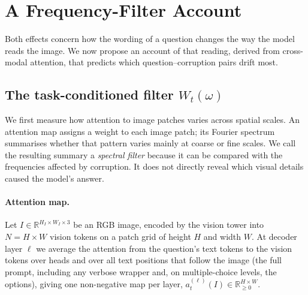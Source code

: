 \documentclass[10pt,twocolumn,letterpaper]{article}
\begin{document}
\section{A Frequency-Filter Account}
\label{sec:theory}
Both effects concern how the wording of a question changes the way the model reads the image. We now propose an account of that reading, derived from cross-modal attention, that predicts which question--corruption pairs drift most.

\subsection{The task-conditioned filter $W_t(\omega)$}
\label{sec:filter}\label{sec:Wt}

We first measure how attention to image patches varies across spatial scales. An attention map assigns a weight to each image patch; its Fourier spectrum summarises whether that pattern varies mainly at coarse or fine scales. We call the resulting summary a \emph{spectral filter} because it can be compared with the frequencies affected by corruption. It does not directly reveal which visual details caused the model's answer.

\paragraph{Attention map.}
Let $I\in\mathbb{R}^{H_I\times W_I\times 3}$ be an RGB image, encoded by
the vision tower into $N=H\times W$ vision tokens on a patch grid of
height $H$ and width $W$. At decoder layer $\ell$ we average the
attention from the question's text tokens to the vision tokens over
heads and over all text positions that follow the image (the full
prompt, including any verbose wrapper and, on multiple-choice levels, the
options), giving one non-negative map per layer,
$a^{(\ell)}_t(I)\in\mathbb{R}_{\ge 0}^{H\times W}$.
\end{document}
